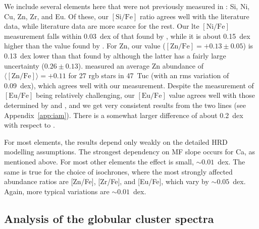 \documentclass{aa}
\begin{document}
We include several elements here that were not previously measured in : Si, Ni, Cu, Zn, Zr, and Eu. 
Of these, our $\mathrm{[Si/Fe]}$ ratio agrees well with the literature data, while literature data are more scarce for the rest. Our \ac{lte} $\mathrm{[Ni/Fe]}$ measurement falls within 0.03~dex of that found by , while it is about 0.15~dex higher than the value found by . 
For Zn, our value ($\mathrm{[Zn/Fe]} = +0.13\pm0.05$) is 0.13~dex lower than that found by  although the latter has a fairly large uncertainty ($0.26\pm0.13$).
\citet{Cerniauskas2018} measured an average Zn abundance of  $\langle\mathrm{[Zn/Fe]}\rangle = +0.11$ for 27 \ac{rgb} stars in 47~Tuc (with an rms variation of 0.09~dex), which agrees well with our measurement. 
Despite the measurement of $\mathrm{[Eu/Fe]}$ being relatively challenging, our $\mathrm{[Eu/Fe]}$ value agrees well with those determined by  and , and we get very consistent results from the two  lines (see Appendix~\ref{app:iam}). There is a somewhat larger difference of about 0.2~dex with respect to . 

For most elements, the results depend only weakly on the detailed HRD modelling assumptions.
The strongest dependency on MF slope occurs for Ca, as mentioned above. For most other elements the effect is small, $\sim0.01$~dex. The same is true for the choice of isochrones, where the most strongly affected abundance ratios are [Zn/Fe], [Zr/Fe], and [Eu/Fe], which vary by $\sim0.05$~dex. Again, more typical variations are $\sim0.01$~dex. 


\subsection{Analysis of the globular cluster spectra}
\label{sec:anal}
\end{document}
